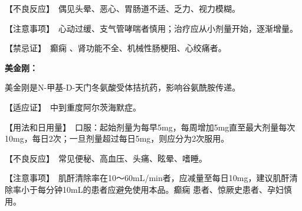 【不良反应】　偶见头晕、恶心、胃肠道不适、乏力、视力模糊。

【注意事项】　心动过缓、支气管哮喘者慎用；治疗应从小剂量开始，逐渐增量。

【禁忌证】　癫痫
、肾功能不全、机械性肠梗阻、心绞痛者。

\textbf{美金刚：}

美金刚是N-甲基-D-天门冬氨酸受体拮抗药，影响谷氨酰胺传递。

【适应证】　中到重度阿尔茨海默症。

【用法和日用量】　口服：起始剂量为每早5mg，每周增加5mg直至最大剂量每次10mg，每日2次；一旦剂量超过每日5mg，则应分为2次服用。

【不良反应】　常见便秘、高血压、头痛、眩晕、嗜睡。

【注意事项】　肌酐清除率在10～60mL/min者，应减量至每日10mg，建议肌酐清除率小于每分钟10mL的患者应避免使用本品。癫痫
患者、惊厥史患者、孕妇慎用。


